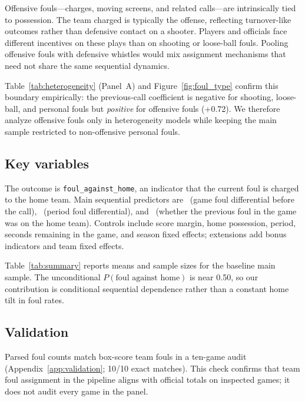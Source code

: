 Offensive fouls---charges, moving screens, and related calls---are intrinsically tied to possession. The team charged is typically the offense, reflecting turnover-like outcomes rather than defensive contact on a shooter. Players and officials face different incentives on these plays than on shooting or loose-ball fouls. Pooling offensive fouls with defensive whistles would mix assignment mechanisms that need not share the same sequential dynamics.

Table~\ref{tab:heterogeneity} (Panel~A) and Figure~\ref{fig:foul_type} confirm this boundary empirically: the previous-call coefficient is negative for shooting, loose-ball, and personal fouls but \emph{positive} for offensive fouls (+0.72). We therefore analyze offensive fouls only in heterogeneity models while keeping the main sample restricted to non-offensive personal fouls.

\subsection{Key variables}

The outcome is \texttt{foul\_against\_home}, an indicator that the current foul is charged to the home team. Main sequential predictors are \fouldiff\ (game foul differential before the call), \perioddiff\ (period foul differential), and \foullast\ (whether the previous foul in the game was on the home team). Controls include score margin, home possession, period, seconds remaining in the game, and season fixed effects; extensions add bonus indicators and team fixed effects.

Table~\ref{tab:summary} reports means and sample sizes for the baseline main sample. The unconditional $P(\text{foul against home})$ is near 0.50, so our contribution is conditional sequential dependence rather than a constant home tilt in foul rates.

\subsection{Validation}

Parsed foul counts match box-score team fouls in a ten-game audit (Appendix~\ref{app:validation}; 10/10 exact matches). This check confirms that team foul assignment in the pipeline aligns with official totals on inspected games; it does not audit every game in the panel.


